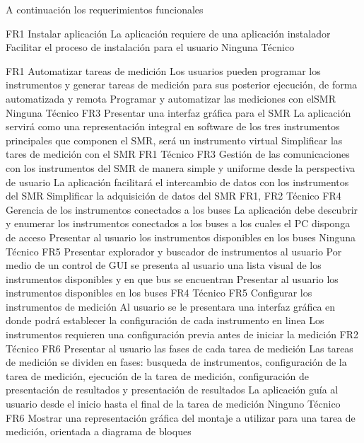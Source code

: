 \documentclass[paper=a4,oneside,fontsize=12pt]{article}
\newcommand{\SMR}{SMR\xspace}
\begin{document}
	A continuación los requerimientos funcionales
	
		{FR1}
			{Instalar aplicación}
			{La aplicación requiere de una aplicación instalador}
			{Facilitar el proceso de instalación para el usuario}
			{Ninguna}
			{Técnico}
		
		{FR1}
			{Automatizar tareas de medición}
			{Los usuarios pueden programar los instrumentos y generar tareas de medición para sus posterior ejecución, de forma automatizada y remota}
			{Programar y automatizar las mediciones con el\SMR}
			{Ninguna}
			{Técnico}
		{FR3}
			{Presentar una interfaz gráfica para el \SMR}
			{La aplicación servirá como una representación integral en software de los tres instrumentos principales que componen el \SMR, será un instrumento virtual}
			{Simplificar las tares de medición con el \SMR}
			{FR1}
			{Técnico}
		{FR3}
			{Gestión de las comunicaciones con los instrumentos del \SMR de manera simple y uniforme desde la perspectiva de usuario}
			{La aplicación facilitará el intercambio de datos con los instrumentos del \SMR}
			{Simplificar la adquisición de datos del \SMR}
			{FR1, FR2}
			{Técnico}				
		{FR4}
			{Gerencia de los instrumentos conectados a los buses}
			{La aplicación debe descubrir y enumerar los instrumentos conectados a los buses a los cuales el PC disponga de acceso}
			{Presentar al usuario los instrumentos disponibles en los buses}
			{Ninguna}
			{Técnico}
		{FR5}
			{Presentar explorador y buscador de instrumentos al usuario}
			{Por medio de un control de GUI se presenta al usuario una lista visual de los instrumentos disponibles y en que bus se encuentran}
			{Presentar al usuario los instrumentos disponibles en los buses}
			{FR4}
			{Técnico}
		{FR5}
			{Configurar los instrumentos de medición}
			{Al usuario se le presentara una interfaz gráfica en donde podrá establecer la configuración de cada instrumento en linea}
			{Los instrumentos requieren una configuración previa antes de iniciar la medición}
			{FR2}
			{Técnico}
		{FR6}
			{Presentar al usuario las fases de cada tarea de medición}
			{Las tareas de medición se dividen en fases: busqueda de instrumentos, configuración de la tarea de medición, ejecución de la tarea de medición, configuración de presentación de resultados y presentación de resultados}
			{La aplicación guía al usuario desde el inicio hasta el final de la tarea de medición}
			{Ninguno}
			{Técnico}
		{FR6}
			{Mostrar una representación gráfica del montaje a utilizar para una tarea de medición, orientada a diagrama de bloques}
\end{document}
